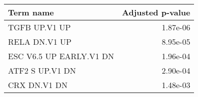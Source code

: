 \begin{tabular}{lr}
\toprule
              Term name &  Adjusted p-value \\
\midrule
          TGFB UP.V1 UP &          1.87e-06 \\
          RELA DN.V1 UP &          8.95e-05 \\
ESC V6.5 UP EARLY.V1 DN &          1.96e-04 \\
        ATF2 S UP.V1 DN &          2.90e-04 \\
           CRX DN.V1 DN &          1.48e-03 \\
\bottomrule
\end{tabular}

